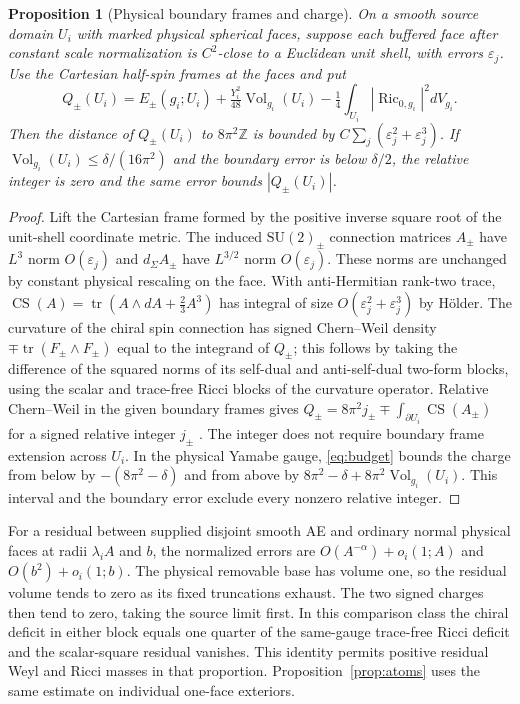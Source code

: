 \documentclass[11pt]{article}
\newtheorem{proposition}[theorem]{Proposition}
\theoremstyle{definition}
\theoremstyle{remark}
\begin{document}
\begin{proposition}[Physical boundary frames and charge]\label{prop:charge}
On a smooth source domain \(U_i\) with marked physical spherical faces, suppose each buffered face after constant scale normalization is \(C^2\)-close to a Euclidean unit shell, with errors \(\varepsilon_j\). Use the Cartesian half-spin frames at the faces and put
\[
 Q_\pm(U_i)=E_\pm(g_i;U_i)+\tfrac{Y_i^2}{48}\operatorname{Vol}_{g_i}(U_i)
             -\tfrac14\int_{U_i}|\operatorname{Ric}_{0,g_i}|^2dV_{g_i}.
\]
Then the distance of \(Q_\pm(U_i)\) to \(8\pi^2\mathbb Z\) is bounded by \(C\sum_j(\varepsilon_j^2+\varepsilon_j^3)\). If \(\operatorname{Vol}_{g_i}(U_i)\le\delta/(16\pi^2)\) and the boundary error is below \(\delta/2\), the relative integer is zero and the same error bounds \(|Q_\pm(U_i)|\).
\end{proposition}
\begin{proof}
Lift the Cartesian frame formed by the positive inverse square root of the unit-shell coordinate metric. The induced \(\mathrm{SU}(2)_\pm\) connection matrices \(A_\pm\) have \(L^3\) norm \(O(\varepsilon_j)\) and \(d_\Sigma A_\pm\) have \(L^{3/2}\) norm \(O(\varepsilon_j)\). These norms are unchanged by constant physical rescaling on the face. With anti-Hermitian rank-two trace, \(\operatorname{CS}(A)=\operatorname{tr}(A\wedge dA+\tfrac23A^3)\) has integral of size \(O(\varepsilon_j^2+\varepsilon_j^3)\) by H\"older. The curvature of the chiral spin connection has signed Chern--Weil density \(\mp\operatorname{tr}(F_\pm\wedge F_\pm)\) equal to the integrand of \(Q_\pm\); this follows by taking the difference of the squared norms of its self-dual and anti-self-dual two-form blocks, using the scalar and trace-free Ricci blocks of the curvature operator. Relative Chern--Weil in the given boundary frames gives \(Q_\pm=8\pi^2j_\pm\mp\int_{\partial U_i}\operatorname{CS}(A_\pm)\) for a signed relative integer \(j_\pm\) \cite[\S3]{ChernSimons1974Characteristic}\cite{Baker2026DiracTransmission}. The integer does not require boundary frame extension across \(U_i\). In the physical Yamabe gauge, \eqref{eq:budget} bounds the charge from below by \(-(8\pi^2-\delta)\) and from above by \(8\pi^2-\delta+8\pi^2\operatorname{Vol}_{g_i}(U_i)\). This interval and the boundary error exclude every nonzero relative integer.
\end{proof}

For a residual between supplied disjoint smooth AE and ordinary normal physical faces at radii \(\lambda_i A\) and \(b\), the normalized errors are \(O(A^{-\alpha})+o_i(1;A)\) and \(O(b^2)+o_i(1;b)\). The physical removable base has volume one, so the residual volume tends to zero as its fixed truncations exhaust. The two signed charges then tend to zero, taking the source limit first. In this comparison class the chiral deficit in either block equals one quarter of the same-gauge trace-free Ricci deficit and the scalar-square residual vanishes. This identity permits positive residual Weyl and Ricci masses in that proportion. Proposition~\ref{prop:atoms} uses the same estimate on individual one-face exteriors.
\end{document}
